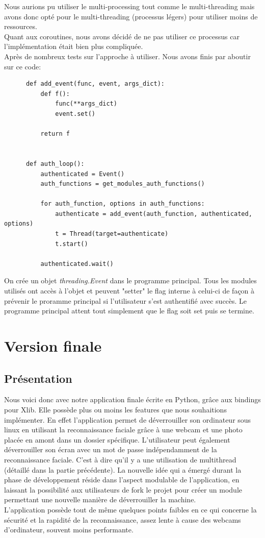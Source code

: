 \documentclass[french]{report}
\begin{document}
Nous aurions pu utiliser le multi-processing tout comme le multi-threading mais avons donc
opté pour le multi-threading (processus légers) pour utiliser moins de ressources.\\
Quant aux coroutines, nous avons décidé de ne pas utiliser ce processus car l'implémentation
était bien plus compliquée.
\\
Après de nombreux tests sur l'approche à utiliser. Nous avons finis par aboutir sur ce code:

  \begin{verbatim}
      def add_event(func, event, args_dict):
          def f():
              func(**args_dict)
              event.set()

          return f


      def auth_loop():
          authenticated = Event()
          auth_functions = get_modules_auth_functions()

          for auth_function, options in auth_functions:
              authenticate = add_event(auth_function, authenticated, options)
              t = Thread(target=authenticate)
              t.start()

          authenticated.wait()
    \end{verbatim}

On crée un objet \emph{threading.Event} dans le programme principal. Tous les modules
utilisés ont accès à l'objet et peuvent "setter" le flag interne à celui-ci de façon
à prévenir le proramme principal si l'utilisateur s'est authentifié avec succès.
Le programme principal attent tout simplement que le flag soit set puis se termine.


\chapter{Version finale}

\newpage

\section{Présentation}
Nous voici donc avec notre application finale écrite en Python, grâce aux bindings
pour Xlib. Elle possède plus ou moins les features que nous souhaitions
implémenter. En effet l'application permet de déverrouiller son ordinateur sous linux
en utilisant la reconnaissance faciale grâce à une webcam et une photo placée
en amont dans un dossier spécifique. L'utilisateur peut également déverrouiller
son écran avec un mot de passe indépendamment de la reconnaissance faciale. C'est
à dire qu'il y a une utilisation de multithread (détaillé dans la partie précédente).
La nouvelle idée qui a émergé durant la phase de développement réside dans
l'aspect modulable de l'application, en laissant la possibilité aux utilisateurs
de fork le projet pour créer un module permettant une nouvelle manière de
déverrouiller la machine.\\
L'application possède tout de même quelques points faibles en ce qui concerne la
sécurité et la rapidité de la reconnaissance, assez lente à cause des webcams
d'ordinateur, souvent moins performante.
\end{document}
